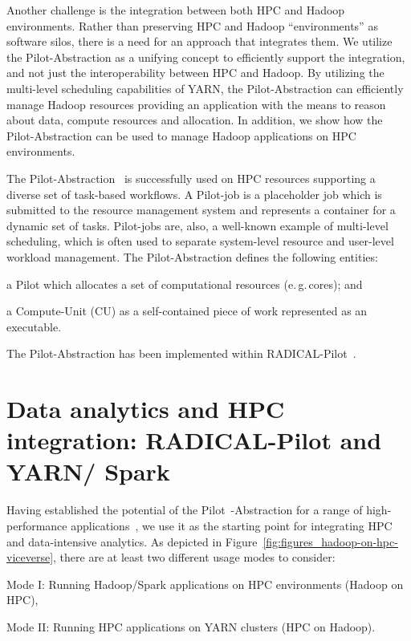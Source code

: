Another challenge is the integration between both HPC and Hadoop environments.
Rather than preserving HPC and Hadoop ``environments'' as software silos, there is a need for an approach that integrates them. 
We utilize the Pilot-Abstraction as a unifying concept to efficiently support the integration, and not just the interoperability between HPC and Hadoop.
By utilizing the multi-level scheduling capabilities of YARN, the Pilot-Abstraction can efficiently manage Hadoop resources providing an application with the means to reason about data, compute resources and allocation.
In addition, we show how the Pilot-Abstraction can be used to manage Hadoop applications on HPC environments.

The Pilot-Abstraction~\cite{luckow2012pstar} is successfully used on HPC resources supporting a diverse set of task-based workflows.
A Pilot-job is a placeholder job which is submitted to the resource management system and represents a container for a dynamic set of tasks.
Pilot-jobs are, also, a well-known example of multi-level scheduling, which is often used to separate system-level resource and user-level workload management.
The Pilot-Abstraction defines the following entities:
\begin{inparaenum} [1)]
    \item a Pilot which allocates a set of computational resources (e.\,g.\,cores); and
    \item  a Compute-Unit (CU) as a self-contained piece of work represented as an executable.
\end{inparaenum}
The Pilot-Abstraction has been implemented within RADICAL-Pilot~\cite{merzky2018design}.


\section{Data analytics and HPC integration: RADICAL-Pilot and YARN/ Spark}
\label{sec:integration_mode}
Having established the potential of the Pilot~-Abstraction for a range of high-performance applications~\cite{treikalis2016repex,ragothaman2014developing,ko2014numerical}, we use it as the starting point for integrating HPC and data-intensive analytics.
As depicted in Figure~\ref{fig:figures_hadoop-on-hpc-viceverse}, there are at least two different usage modes to consider:
\begin{inparaenum}[1)]
    \item Mode I: Running Hadoop/Spark applications on HPC environments (Hadoop on HPC),
    \item Mode II: Running HPC applications on YARN clusters (HPC on Hadoop).
\end{inparaenum}


